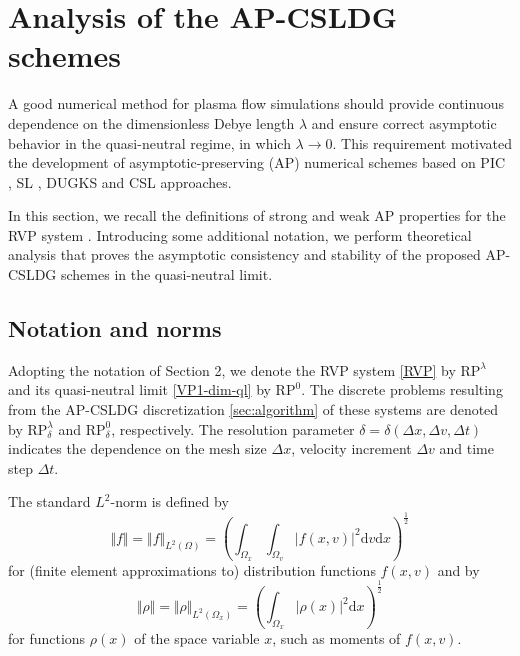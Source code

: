 \documentclass[letterpaper,10pt]{article}
\numberwithin{equation}{section}
\numberwithin{figure}{section}
\numberwithin{table}{section}
\begin{document}
\section{Analysis of the AP-CSLDG schemes}

\hspace{4pt}
A good numerical method for plasma flow simulations should provide
continuous dependence on the dimensionless Debye length $\lambda$ and ensure
correct asymptotic behavior in the quasi-neutral regime, in which $\lambda\to 0$.  
This requirement motivated the development of asymptotic-preserving (AP) numerical
schemes based on PIC \cite{DEGOND2006, DEGOND2010}, SL \cite{DEGOND2009}, DUGKS \cite{LIU2020} and CSL \cite{LIU2025} approaches.

In this section, we recall the definitions
of strong and weak AP properties for the RVP system \cite{Crou2016}. Introducing
some additional notation, we perform theoretical analysis that proves the
asymptotic consistency and stability of the proposed AP-CSLDG schemes
in the quasi-neutral limit.






\subsection{Notation and norms}

Adopting the notation of Section 2, we denote the  RVP system \eqref{RVP} by $\text{RP}^{\lambda}$ and its  quasi-neutral limit \eqref{VP1-dim-ql} by $\text{RP}^{0}$. The discrete 
problems resulting from the AP-CSLDG discretization \eqref{sec:algorithm} of these systems are denoted by
$\text{RP}^{\lambda}_{\delta}$ and $\text{RP}^0_{\delta}$, respectively. The resolution
parameter $\delta=\delta (\Delta x,\Delta v,\Delta t)$ indicates the dependence on the
mesh size $\Delta x$, velocity increment $\Delta v$ and time step $\Delta t$.

The standard $L^2$-norm is defined by
$$
    \Vert f \Vert = \Vert f \Vert_{L^2(\Omega)}
    =\left(\int_{\Omega_x}\int_{\Omega_v}\vert f(x,v)\vert ^2\mathrm dv\mathrm dx\right)^{\frac{1}{2}}
$$
for (finite element approximations to) distribution functions $f(x,v)$ and by
$$
    \Vert \rho \Vert = \Vert \rho \Vert_{L^2(\Omega_x)}=\left(\int_{\Omega_x}\vert \rho(x) \vert ^2\mathrm dx\right)^{\frac{1}{2}}
$$
for functions $\rho(x)$ of the space variable $x$, such as moments of $f(x,v)$.
\end{document}

